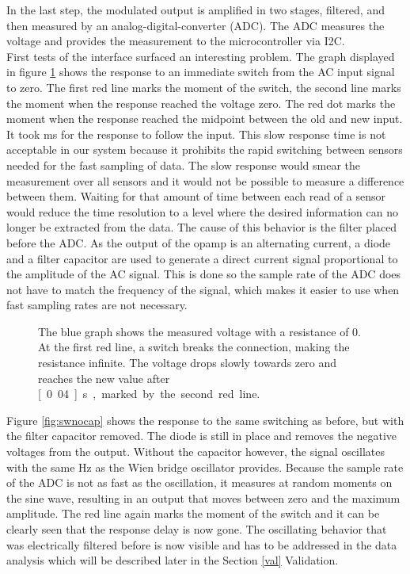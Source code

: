 In the last step, the modulated output is amplified in two stages, filtered, and then measured by an analog-digital-converter (ADC). The ADC measures the voltage and provides the measurement to the microcontroller via I2C.\\

First tests of the interface surfaced an interesting problem. The graph displayed in figure \ref{fig:swcap} shows the response to an immediate switch from the AC input signal to zero. The first red line marks the moment of the switch, the second line marks the moment when the response reached the voltage zero. The red dot marks the moment when the response reached the midpoint between the old and new input. It took \unit[40]{ms} for the response to follow the input. This slow response time is not acceptable in our system because it prohibits the rapid switching between sensors needed for the fast sampling of data. The slow response would smear the measurement over all sensors and it would not be possible to measure a difference between them. Waiting for that amount of time between each read of a sensor would reduce the time resolution to a level where the desired information can no longer be extracted from the data. The cause of this behavior is the filter placed before the ADC. As the output of the opamp is an alternating current, a diode and a filter capacitor are used to generate a direct current signal proportional to the amplitude of the AC signal. This is done so the sample rate of the ADC does not have to match the frequency of the signal, which makes it easier to use when fast sampling rates are not necessary.\\

\begin{figure}[H]
	\begin{center}
		
		\caption[The scatter plot shows the measured voltage with a resistance of 0.]{The blue graph shows the measured voltage with a resistance of 0. At the first red line, a switch breaks the connection, making the resistance infinite. The voltage drops slowly towards zero and reaches the new value after \unit[0.04]{s}, marked by the second red line.}
		\label{fig:swcap}
	\end{center}
\end{figure}

Figure \ref{fig:swnocap} shows the response to the same switching as before, but with the filter capacitor removed. The diode is still in place and removes the negative voltages from the output. Without the capacitor however, the signal oscillates with the same \unit[1666]{Hz} as the Wien bridge oscillator provides. Because the sample rate of the ADC is not as fast as the oscillation, it measures at random moments on the sine wave, resulting in an output that moves between zero and the maximum amplitude. The red line again marks the moment of the switch and it can be clearly seen that the response delay is now gone. The oscillating behavior that was electrically filtered before is now visible and has to be addressed in the data analysis which will be described later in the Section \ref{val} Validation.

